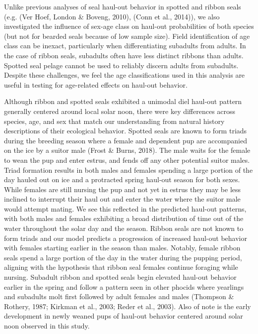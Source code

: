 \documentclass[fleqn,10pt,lineno]{wlpeerj} %
\begin{document}
Unlike previous analyses of seal haul-out behavior in spotted and ribbon seals
(e.g. (Ver Hoef, London \& Boveng, 2010), (Conn et al., 2014)), we also investigated the influence of
sex-age class on haul-out probabilities of both species (but not for bearded seals
because of low sample size). Field identification of age class can be inexact,
particularly when differentiating subadults from adults. In the case of ribbon
seals, subadults often have less distinct ribbons than adults. Spotted seal
pelage cannot be used to reliably discern adults from subadults. Despite these
challenges, we feel the age classifications used in this analysis are useful in
testing for age-related effects on haul-out behavior.

Although ribbon and spotted seals exhibited a
unimodal diel haul-out pattern generally centered around local solar noon, there
were key differences across species, age, and sex that match our understanding
from natural history descriptions of their ecological behavior. Spotted seals
are known to form triads during the breeding season where a female and dependent
pup are accompanied on the ice by a suitor male (Frost \& Burns, 2018). The male waits for
the female to wean the pup and enter estrus, and fends off any other potential
suitor males. Triad formation results in both males and females spending a large
portion of the day hauled out on ice and a protracted spring haul-out season for
both sexes. While females are still nursing the pup and not yet in estrus they
may be less inclined to interrupt their haul out and enter the water where the
suitor male would attempt mating. We see this reflected in the predicted
haul-out patterns, with both males and females exhibiting a broad distribution
of time out of the water throughout the solar day and the season. Ribbon seals
are not known to form triads and our model predicts a progression of increased
haul-out behavior with females starting earlier in the season than males.
Notably, female ribbon seals spend a large portion of the day in the water
during the pupping period, aligning with the hypothesis that ribbon seal females
continue foraging while nursing. Subadult ribbon and spotted seals begin
elevated haul-out behavior earlier in the spring and follow a pattern seen in
other phocids where yearlings and subadults molt first followed by adult females
and males (Thompson \& Rothery, 1987; Kirkman et al., 2003; Reder et al., 2003). Also of note is the early
development in newly weaned pups of haul-out behavior centered around solar noon
observed in this study.
\end{document}
